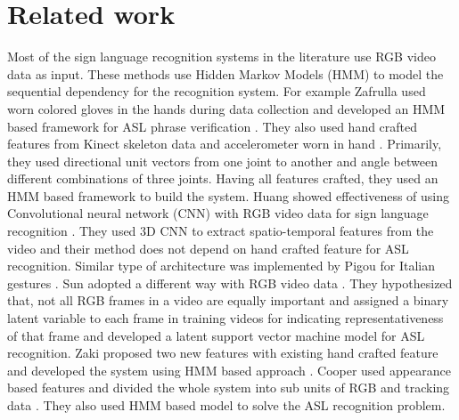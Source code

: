 \documentclass[10pt,twocolumn,letterpaper]{article}
\begin{document}
\section{Related work}
Most of the sign language recognition systems in the literature use RGB video data as input. These methods use Hidden Markov Models (HMM) to model the sequential dependency for the recognition system. For example Zafrulla \etal used worn colored gloves in the hands during data collection and developed an HMM based framework for ASL phrase verification \cite{copycat_zafrulla}. They also used hand crafted features from Kinect skeleton data and accelerometer worn in hand \cite{Zafrulla:2011:ASL:2070481.2070532}. Primarily, they used directional unit vectors from one joint to another and angle between different combinations of three joints. Having all features crafted, they used an HMM based framework to build the system. Huang \etal showed effectiveness of using Convolutional neural network (CNN) with RGB video data for sign language recognition \cite{7177428}. They used 3D CNN \cite{Ji:2013:CNN:2412386.2412939} to extract spatio-temporal features from the video and their method does not depend on hand crafted feature for ASL recognition. Similar type of architecture was implemented by Pigou \etal for Italian gestures \cite{978-3-319-16178-5_40}. Sun \etal adopted a different way with RGB video data \cite{Sun:2015:LSV:2753829.2629481}. They hypothesized that, not all RGB frames in a video are equally important and assigned a binary latent variable to each frame in training videos for indicating representativeness of that frame and developed a latent support vector machine model for ASL recognition. Zaki \etal proposed two new features with existing hand crafted feature and developed the system using HMM based approach \cite{ZAKI2011572}. Cooper \etal used appearance based features and divided the whole system into sub units of RGB and tracking data \cite{Cooper2017}. They also used HMM based model to solve the ASL recognition problem. 
\end{document}
